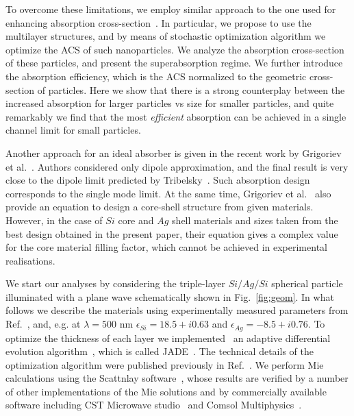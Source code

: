 \documentclass[aps,prl,twocolumn,showpacs,superscriptaddress,groupedaddress]{revtex4-1}
\begin{document}
To overcome these limitations, we employ similar approach to the one
used for enhancing absorption cross-section~\cite{Fan-2011}. In
particular, we propose to use the multilayer structures, and by means
of stochastic optimization algorithm we optimize the ACS of such
nanoparticles. We analyze the absorption cross-section of these
particles, and present the superabsorption regime. We further
introduce the absorption efficiency, which is the ACS normalized to
the geometric cross-section of particles. Here we show that there is a
strong counterplay between the increased absorption for larger
particles vs size for smaller particles, and quite remarkably we find
that the most {\em efficient} absorption can be achieved in a single
channel limit for small particles.

Another approach for an ideal absorber is given in the recent work by
Grigoriev et al.~\cite{Grigoriev-2015}. Authors considered only dipole
approximation, and the final result is very close to the dipole limit
predicted by Tribelsky~\cite{Tribelsky-2011}.  Such absorption design
corresponds to the single mode limit.  At the same time, Grigoriev et
al.~\cite{Grigoriev-2015} also provide an equation to design a
core-shell structure from given materials. However, in the case of
$Si$ core and $Ag$ shell materials and sizes taken from the best
design obtained in the present paper, their equation gives a complex
value for the core material filling factor, which cannot be achieved
in experimental realisations.

\begin{figure}
\end{figure}


We start our analyses by considering the triple-layer $Si/Ag/Si$
spherical particle illuminated with a plane wave schematically shown
in Fig.~\ref{fig:geom}. In what follows we describe the materials
using experimentally measured parameters from Ref.~\cite{palik-1997},
and, e.g. at $\lambda = 500$ nm $\epsilon_{Si} = 18.5 + i0.63$ and
$\epsilon_{Ag} = -8.5 + i0.76$.  To optimize the thickness of each
layer we implemented~\cite{JADE-web} an adaptive differential
evolution algorithm~\cite{Storn-DE-first-1997}, which is called
JADE~\cite{Jingqiao-JADE-2009}.  The technical details of the
optimization algorithm were published previously in
Ref.~\cite{Ladutenko-2014}. We perform Mie calculations using the
Scattnlay software~\cite{Pena-scattnlay-2009,Scattnlay-web}, whose
results are verified by a number of other implementations of the Mie
solutions and by commercially available software including CST
Microwave studio~\cite{CST-web} and Comsol
Multiphysics~\cite{Comsol-web}.
\end{document}
